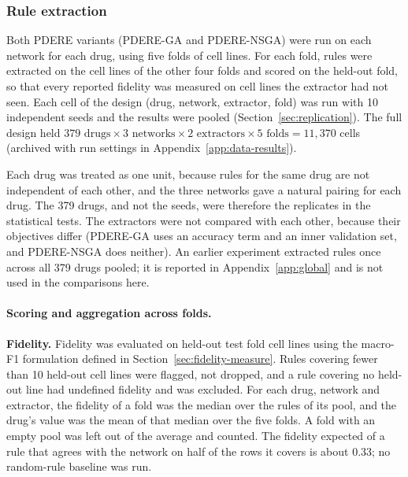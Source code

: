 \subsubsection{Rule extraction}
\label{sec:extraction}

Both PDERE variants (PDERE-GA and PDERE-NSGA) were run on each network for each drug, using five folds of cell lines. For each fold, rules were extracted on the cell lines of the other four folds and scored on the held-out fold, so that every reported fidelity was measured on cell lines the extractor had not seen. Each cell of the design (drug, network, extractor, fold) was run with 10 independent seeds and the results were pooled (Section~\ref{sec:replication}). The full design held $379 \text{ drugs} \times 3 \text{ networks} \times 2 \text{ extractors} \times 5 \text{ folds} = 11{,}370$ cells (archived with run settings in Appendix~\ref{app:data-results}).

Each drug was treated as one unit, because rules for the same drug are not independent of each other, and the three networks gave a natural pairing for each drug. The 379 drugs, and not the seeds, were therefore the replicates in the statistical tests. The extractors were not compared with each other, because their objectives differ (PDERE-GA uses an accuracy term and an inner validation set, and PDERE-NSGA does neither). An earlier experiment extracted rules once across all 379 drugs pooled; it is reported in Appendix~\ref{app:global} and is not used in the comparisons here.

\paragraph{Scoring and aggregation across folds.}

\textbf{Fidelity.}
Fidelity was evaluated on held-out test fold cell lines using the macro-F1 formulation defined in Section~\ref{sec:fidelity-measure}. Rules covering fewer than 10 held-out cell lines were flagged, not dropped, and a rule covering no held-out line had undefined fidelity and was excluded. For each drug, network and extractor, the fidelity of a fold was the median over the rules of its pool, and the drug's value was the mean of that median over the five folds. A fold with an empty pool was left out of the average and counted. The fidelity expected of a rule that agrees with the network on half of the rows it covers is about 0.33; no random-rule baseline was run.


